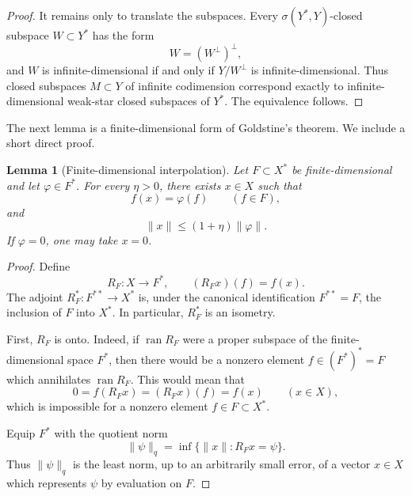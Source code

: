 \documentclass[11pt,reqno]{amsart}
\makeatletter
\theoremstyle{plain}
\newtheorem{lemma}[lemma]{Lemma}
\theoremstyle{definition}
\newcounter{problempaper}
\newenvironment{problempaperbody}{%
  \setcounter{subsection}{0}%
  \setcounter{subsubsection}{0}%
  \setcounter{paragraph}{0}%
  \renewcommand{\thesubsection}{\arabic{subsection}}%
  \renewcommand{\thesubsubsection}{\thesubsection.\arabic{subsubsection}}%
  \renewcommand{\theparagraph}{\thesubsubsection.\arabic{paragraph}}%
  \let\problem@outersection\section
  \let\problem@outersubsection\subsection
  \let\problem@outersubsubsection\subsubsection
  \let\problem@outerparagraph\paragraph
  \let\section\problem@papersection
  \let\subsection\problem@papersubsection
  \let\subsubsection\problem@papersubsubsection
}{%
  \let\section\problem@outersection
  \let\subsection\problem@outersubsection
  \let\subsubsection\problem@outersubsubsection
  \let\paragraph\problem@outerparagraph
}
\newcommand{\problem@target}[2]{%
  \hypertarget{problem-\theproblempaper-#1-#2}{}%
}
\newcommand{\problem@paperheading}[3]{%
  \par\bigskip
  \problem@target{#1}{#2}%
  \noindent{\large\bfseries #2.\quad #3\par}%
  \nobreak\smallskip
}
\newcommand{\problem@papersubheading}[3]{%
  \par\medskip
  \problem@target{#1}{#2}%
  \noindent{\normalsize\bfseries #2.\quad #3\par}%
  \nobreak\smallskip
}
\newcommand{\problem@papersubsubheading}[3]{%
  \par\smallskip
  \problem@target{#1}{#2}%
  \noindent{\normalsize\itshape #2.\quad #3.\ }%
}
\def\problem@papersection{%
  \@ifstar{\problem@papersectionstar}{\problem@papersectionnostar}%
}
\def\problem@papersectionstar#1{%
  \par\bigskip\noindent{\large\bfseries #1\par}\nobreak\smallskip
}
\def\problem@papersectionnostar#1{%
  \refstepcounter{subsection}%
  \setcounter{subsubsection}{0}%
  \setcounter{paragraph}{0}%
  \problem@paperheading{section}{\thesubsection}{#1}%
  \problem@writecontentsline{section}{\thesubsection}{#1}%
}
\def\problem@papersubsection{%
  \@ifstar{\problem@papersubsectionstar}{\problem@papersubsectionnostar}%
}
\def\problem@papersubsectionstar#1{%
  \par\medskip\noindent{\normalsize\bfseries #1\par}\nobreak\smallskip
}
\def\problem@papersubsectionnostar#1{%
  \refstepcounter{subsubsection}%
  \setcounter{paragraph}{0}%
  \problem@papersubheading{subsection}{\thesubsubsection}{#1}%
  \problem@writecontentsline{subsection}{\thesubsubsection}{#1}%
}
\def\problem@papersubsubsection{%
  \@ifstar{\problem@papersubsubsectionstar}{\problem@papersubsubsectionnostar}%
}
\def\problem@papersubsubsectionstar#1{%
  \par\smallskip\noindent{\normalsize\itshape #1.\ }%
}
\def\problem@papersubsubsectionnostar#1{%
  \refstepcounter{paragraph}%
  \problem@papersubsubheading{subsubsection}{\theparagraph}{#1}%
  \problem@writecontentsline{subsubsection}{\theparagraph}{#1}%
}
\newcommand{\problem@writecontentsline}[3]{%
  \begingroup
  \protected@write\@auxout{}{%
    \string\problemcontentsentry{\theproblempaper}{#1}{#2}{#3}{\thepage}%
  }%
  \endgroup
}
\newcommand{\problemcontentsentry}[5]{%
  \@ifundefined{problemcontents@#1}{%
    \expandafter\gdef\csname problemcontents@#1\endcsname{}%
  }{}%
  \expandafter\g@addto@macro\csname problemcontents@#1\endcsname{%
    \problemcontentsline{#1}{#2}{#3}{#4}{#5}%
  }%
}
\newcommand{\problemcontentslink}[4]{%
  \hyperlink{problem-#1-#2-#3}{#4}%
}
\newcommand{\problemcontentsline}[5]{%
  \ifstrequal{#2}{section}{%
    \par\noindent
    \problemcontentslink{#1}{#2}{#3}{\makebox[2.5em][l]{#3}#4}%
    \nobreak\dotfill
    \problemcontentslink{#1}{#2}{#3}{#5}\par
  }{%
    \ifstrequal{#2}{subsection}{%
      \par\noindent\hspace*{1.5em}%
      \problemcontentslink{#1}{#2}{#3}{\makebox[3.5em][l]{#3}#4}%
      \nobreak\dotfill
      \problemcontentslink{#1}{#2}{#3}{#5}\par
    }{%
      \par\noindent\hspace*{3em}%
      \problemcontentslink{#1}{#2}{#3}{\makebox[4.5em][l]{#3}#4}%
      \nobreak\dotfill
      \problemcontentslink{#1}{#2}{#3}{#5}\par
    }%
  }%
}
\makeatother
\begin{document}
\begin{problempaperbody}
\begin{proof}
It remains only to translate the subspaces. Every $\sigma(Y^*,Y)$-closed subspace $W\subset Y^*$ has the form
\begin{equation*}
        W=(W^\perp)^\perp,
\end{equation*}
and $W$ is infinite-dimensional if and only if $Y/W^\perp$ is infinite-dimensional. Thus closed subspaces $M\subset Y$ of infinite codimension correspond exactly to infinite-dimensional weak-star closed subspaces of $Y^*$. The equivalence follows.
\end{proof}

The next lemma is a finite-dimensional form of Goldstine's theorem. We include a short direct proof.

\begin{lemma}[Finite-dimensional interpolation]
\label{p4:lem:finite-dimensional-interpolation}
Let $F\subset X^*$ be finite-dimensional and let $\varphi\in F^*$. For every $\eta>0$, there exists $x\in X$ such that
\begin{equation*}
        f(x)=\varphi(f) \qquad(f\in F),
\end{equation*}
and
\begin{equation*}
        \|x\|\leq (1+\eta)\|\varphi\|.
\end{equation*}
If $\varphi=0$, one may take $x=0$.
\end{lemma}

\begin{proof}
Define
\begin{equation*}
        R_F \colon X\to F^*, \qquad (R_Fx)(f)=f(x).
\end{equation*}
The adjoint $R_F^* \colon F^{**}\to X^*$ is, under the canonical identification $F^{**}=F$, the inclusion of $F$ into $X^*$. In particular, $R_F^*$ is an isometry.

First, $R_F$ is onto. Indeed, if $\operatorname{ran}R_F$ were a proper subspace of the finite-dimensional space $F^*$, then there would be a nonzero element $f\in (F^*)^*=F$ which annihilates $\operatorname{ran}R_F$. This would mean that
\begin{equation*}
        0=f(R_Fx)=(R_Fx)(f)=f(x) \qquad(x\in X),
\end{equation*}
which is impossible for a nonzero element $f\in F\subset X^*$.

Equip $F^*$ with the quotient norm
\begin{equation*}
        \|\psi\|_q=\inf\{\|x\|:R_Fx=\psi\}.
\end{equation*}
Thus $\|\psi\|_q$ is the least norm, up to an arbitrarily small error, of a vector $x\in X$ which represents $\psi$ by evaluation on $F$.


\end{proof}
\end{problempaperbody}
\end{document}

